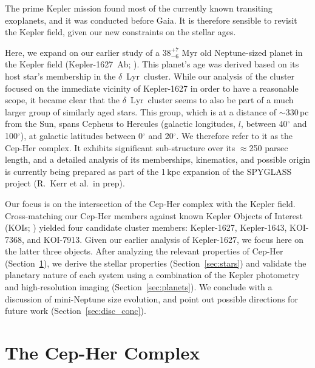 \documentclass[12pt,twocolumn]{aastex63}
\begin{document}
The prime Kepler mission \citep{borucki_kepler_2010} found most of the
currently known transiting exoplanets, and it was conducted before
Gaia.  It is therefore sensible to revisit the Kepler field, given our
new constraints on the stellar ages.

Here, we expand on our earlier study of a $38^{+7}_{-6}$ Myr old
Neptune-sized planet in the Kepler field (Kepler-1627~Ab;
\citealt{bouma_kep1627_2022}).  This planet's age was derived based on
its host star's membership in the $\delta$\ Lyr\ cluster.  While our
analysis of the cluster focused on the immediate vicinity of
Kepler-1627 in order to have a reasonable scope,  it became clear that
the $\delta$\ Lyr\ cluster seems to also be part of a much larger
group of similarly aged stars.  This group, which is at a distance of
$\sim$330\,pc from the Sun, spans Cepheus to Hercules (galactic
longitudes, $l$, between 40$^\circ$ and 100$^\circ$), at galactic
latitudes between 0$^\circ$ and 20$^\circ$.  We therefore refer to it
as the Cep-Her complex.  It exhibits significant sub-structure over
its $\approx$250 parsec length, and a detailed analysis of its
memberships, kinematics, and possible origin is currently being
prepared as part of the 1\,kpc expansion of the SPYGLASS project
(R.~Kerr et al.\ in prep).

Our focus is on the intersection of the Cep-Her complex with the
Kepler field.  Cross-matching our Cep-Her members against known Kepler
Objects of Interest (KOIs; \citealt{thompson_planetary_2018}) yielded
four candidate cluster members: Kepler-1627, Kepler-1643, KOI-7368,
and KOI-7913.  Given our earlier analysis of Kepler-1627, we focus
here on the latter three objects.  After analyzing the relevant
properties of Cep-Her (Section~\ref{sec:cluster}), we derive the
stellar properties (Section~\ref{sec:stars}) and validate the
planetary nature of each system using a combination of the Kepler
photometry and high-resolution imaging (Section~\ref{sec:planets}).
We conclude with a discussion of mini-Neptune size evolution, and
point out possible directions for future work
(Section~\ref{sec:disc_conc}).

\section{The Cep-Her Complex}
\label{sec:cluster}
\end{document}
